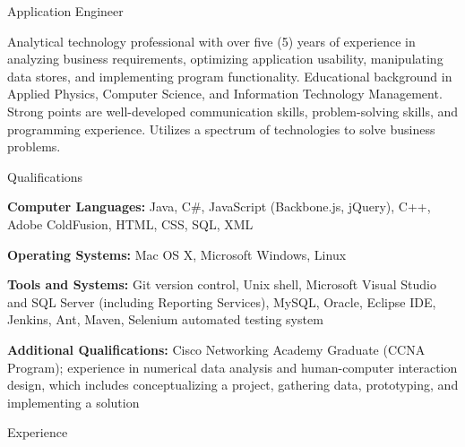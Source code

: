 



\vspace{1mm}

\begin{Large}\textsf{Application Engineer}\end{Large} \vspace{-2mm}

\begin{itemize1}
	\item Analytical technology professional with over five (5) years of experience in analyzing business requirements, optimizing application usability, manipulating data stores, and implementing program functionality.  Educational background in Applied Physics, Computer Science, and Information Technology Management. Strong points are well-developed communication skills, problem-solving skills, and programming experience. Utilizes a spectrum of technologies to solve business problems.
\end{itemize1}

\begin{Large}\textsf{Qualifications}\end{Large} \vspace{-2mm}

\begin{itemize1}
	\item \textbf{Computer Languages:} Java, C\#, JavaScript (Backbone.js, jQuery), C++, Adobe ColdFusion, HTML, CSS, SQL, XML \vspace{2mm}
	\item \textbf{Operating Systems:} Mac OS X, Microsoft Windows, Linux \vspace{2mm}
	\item \textbf{Tools and Systems:} Git version control, Unix shell, Microsoft Visual Studio and SQL Server (including Reporting Services), MySQL, Oracle, Eclipse IDE, Jenkins, Ant, Maven, Selenium automated testing system \vspace{2mm}
	\item \textbf{Additional Qualifications:} Cisco Networking Academy Graduate (CCNA Program); experience in numerical data analysis and human-computer interaction design, which includes conceptualizing a project, gathering data, prototyping, and implementing a solution
\end{itemize1}

\begin{Large}\textsf{Experience}\end{Large} \vspace{-2mm}

